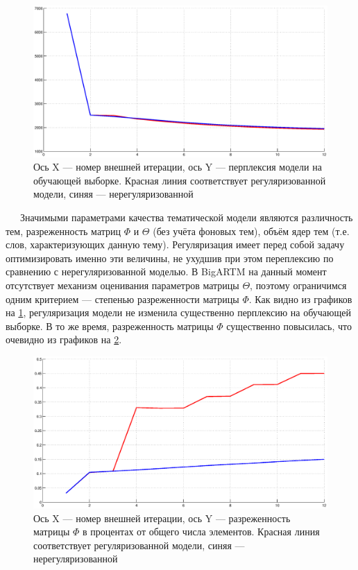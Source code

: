 \begin{figure}[h!]\center
\includegraphics[scale = 0.5]{perplexity.eps}
\caption{Ось X --- номер внешней итерации, ось Y --- перплексия модели на обучающей выборке. Красная линия соответствует регуляризованной модели, синяя --- нерегуляризованной}
\label{pic_1}
\end{figure}

$\quad\;\:$Значимыми параметрами качества тематической модели являются различность тем, разреженность матриц $\Phi$ и $\Theta$ (без учёта фоновых тем), объём ядер тем (т.е. слов, характеризующих данную тему). Регуляризация имеет перед собой задачу оптимизировать именно эти величины, не ухудшив при этом переплексию по сравнению с нерегуляризованной моделью. В BigARTM на данный момент отсутствует механизм оценивания параметров матрицы $\Theta$, поэтому ограничимся одним критерием --- степенью разреженности матрицы $\Phi$. Как видно из графиков на \ref{pic_1}, регуляризация модели не изменила существенно перплексию на обучающей выборке. В то же время, разреженность матрицы $\Phi$ существенно повысилась, что очевидно из графиков на \ref{pic_2}.

\begin{figure}[h!]\center
\includegraphics[scale = 0.5]{sparsity.eps}
\caption{Ось X --- номер внешней итерации, ось Y --- разреженность матрицы $\Phi$ в процентах от общего числа элементов. Красная линия соответствует регуляризованной модели, синяя --- нерегуляризованной}
\label{pic_2}
\end{figure}